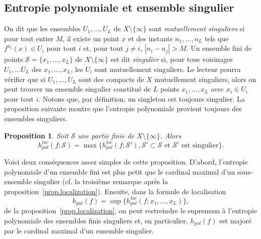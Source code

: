 \documentclass[11pt]{article}
\newtheorem{prop}[theo]{Proposition}
\theoremstyle{definition}
\numberwithin{equation}{section}
\numberwithin{figure}{section}
\numberwithin{table}{section}
\newcommand*\cS{{\mathcal S}}
\begin{document}
\subsection{Entropie polynomiale et ensemble singulier}\label{ss.singular-set}

On dit que les ensembles $U_{1}, \dots, U_{L}$ de $X \setminus \{\infty\}$ sont \emph{mutuellement singuliers} si pour tout entier $M$, il existe un point $x$ et des instants $n_{1}, \dots, n_{L}$ tels que $f^{n_{i}} (x) \in U_{i}$ pour tout $i$ et, pour tout $j \neq i$, $\left| n_{i}-n_{j} \right|> M$. Un ensemble fini de points $\cS = \{x_{1}, \dots, x_{L} \}$ de $X \setminus \{\infty\}$ est dit \emph{singulier} si, pour tous voisinages $U_{1}, \dots U_{L}$ des $x_1, \dots, x_L$, les $U_i$ sont mutuellement singuliers. Le lecteur pourra vérifier que si $U_{1}, \dots, U_{L}$ sont des compacts de $X$ mutuellement singuliers, alors on peut trouver {un ensemble singulier constitué de} $L$ points $x_{1}, \dots, x_{L}$ avec $x_{i} \in U_{i}$ pour tout $i$. Notons que, {par définition}, un {singleton} est toujours singulier. La proposition suivante montre que l'entropie polynomiale provient toujours des ensembles singuliers.

\begin{prop}\label{prop.singulier}
Soit $\cS$ {une partie finie} de $X \setminus \{\infty\}$. Alors
\[
h^{loc}_{pol}(f; \cS) =\max\{h^{loc}_{pol}(f; \cS'), \cS' \subset \cS \text{ et } \cS' \text{ est singulier}\}.
\]
\end{prop}

Voici deux conséquences assez simples de cette proposition. D'abord, l'entropie polynomiale d'un ensemble fini est plus petit que le cardinal maximal d'un sous-ensemble singulier (cf. la troisième remarque après la proposition~\ref{prop.localization}). Ensuite, dans la formule de localisation
\[
h_{pol}(f) = \sup\{h^{loc}_{pol}(f;x_{1}, \dots, x_{L})\},
\]
de la proposition~\ref{prop.localization}, on peut restreindre le supremum à l'entropie polynomiale des ensembles finis singuliers et, en particulier, $h_{pol}(f)$ est majoré par le cardinal maximal d'un ensemble singulier.
\end{document}
